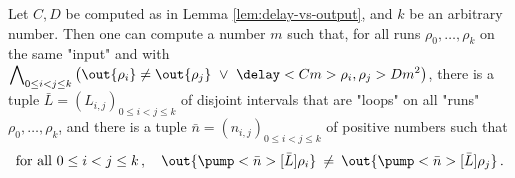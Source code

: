 \documentclass{theoretics}
\begin{document}
\begin{lemma}\label{lem:saarela-delay}\label{cor:saarela-delay}
Let $C,D$ be computed as in Lemma \ref{lem:delay-vs-output},
and $k$ be an arbitrary number. Then one can compute a number $m$
such that, for all runs $\rho_0,\dots,\rho_k$ on the same "input" and with 
$\displaystyle\bigwedge\nolimits_{0\le i<j\le k} 
 \big(\out{\rho_i} \neq \out{\rho_j} ~\vee~
      \delay<C m>{\rho_i,\rho_j} > D m^2\big)$,
there is a tuple 
$\bar{L} = (L_{i,j})_{0\le i<j\le k}$ of disjoint intervals
that are "loops" on all "runs" $\rho_0,\dots,\rho_k$,
and there is a tuple $\bar n = (n_{i,j})_{0\le i<j\le k}$
of positive numbers such that
\[
  \text{for all } 0\le i<j\le k\,, \quad 
  \out{\pump<\bar n>[\bar L]{\rho_i}} 
  \:\neq\:
  \out{\pump<\bar n>[\bar L]{\rho_j}} \, .
\]
\end{lemma} 
\end{document}
